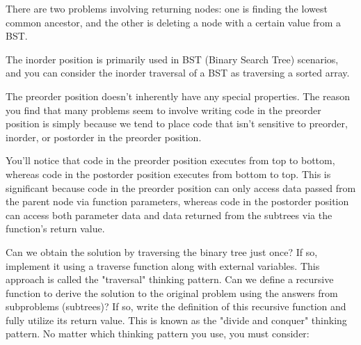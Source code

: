 \documentclass[a4paper,11pt,twoside]{book}
\begin{document}
	\par There are two problems involving returning nodes: one is finding the lowest common ancestor, and the other is deleting a node with a certain value from a BST. 
	
	
	
	\par The inorder position is primarily used in BST (Binary Search Tree) scenarios, and you can consider the inorder traversal of a BST as traversing a sorted array.
	
	\par The preorder position doesn’t inherently have any special properties. The reason you find that many problems seem to involve writing code in the preorder position is simply because we tend to place code that isn’t sensitive to preorder, inorder, or postorder in the preorder position.

	\par You’ll notice that code in the preorder position executes from top to bottom, whereas code in the postorder position executes from bottom to top. This is significant because code in the preorder position can only access data passed from the parent node via function parameters, whereas code in the postorder position can access both parameter data and data returned from the subtrees via the function's return value.
	
	\par Can we obtain the solution by traversing the binary tree just once? If so, implement it using a traverse function along with external variables. This approach is called the "traversal" thinking pattern. Can we define a recursive function to derive the solution to the original problem using the answers from subproblems (subtrees)? If so, write the definition of this recursive function and fully utilize its return value. This is known as the "divide and conquer" thinking pattern. No matter which thinking pattern you use, you must consider:
\end{document}
